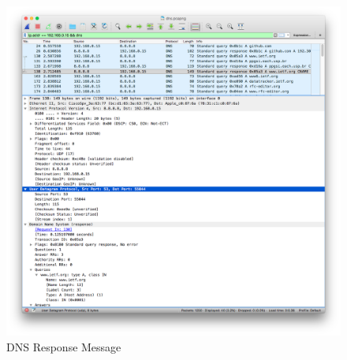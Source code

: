 \documentclass[11pt]{article}
\begin{document}
		\begin{figure}[H]
		\centering
		\caption{DNS Response Message}
		\includegraphics[width=460px]{05}
		\end{figure}
		
\pagebreak
		
\end{document}
